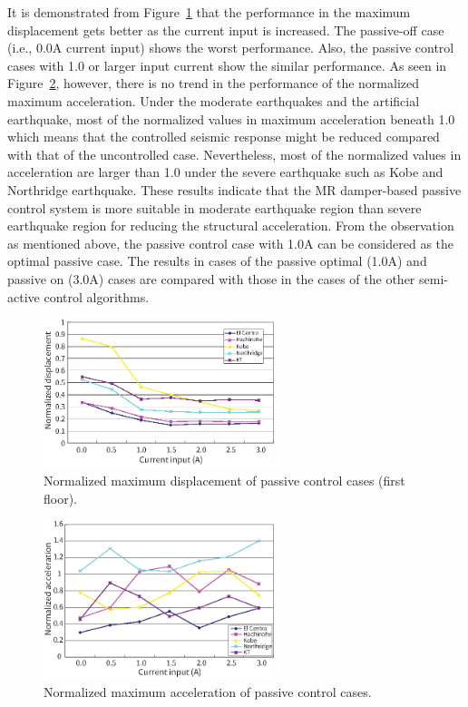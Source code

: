 It is demonstrated from Figure~\ref{fig:n3-12} that the performance in the maximum displacement gets better as the current input is increased. The passive-off case (i.e., 0.0A current input) shows the worst performance. Also, the passive control cases with 1.0 or larger input current show the similar performance. As seen in Figure~\ref{fig:n3-13}, however, there is no trend in the performance of the normalized maximum acceleration. Under the moderate earthquakes and the artificial earthquake, most of the normalized values in maximum acceleration beneath 1.0 which means that the controlled seismic response might be reduced compared with that of the uncontrolled case. Nevertheless, most of the normalized values in acceleration are larger than 1.0 under the severe earthquake such as Kobe and Northridge earthquake. These results indicate that the MR damper-based passive control system is more suitable in moderate earthquake region than severe earthquake region for reducing the structural acceleration. From the observation as mentioned above, the passive control case with 1.0A can be considered as the optimal passive case. The results in cases of the passive optimal (1.0A) and passive on (3.0A) cases are compared with those in the cases of the other semi-active control algorithms.

\begin{figure}[!ht]
\centering
\includegraphics[width=0.6\textwidth] {figure/n3-12.eps}
\caption{Normalized maximum displacement of passive control
cases (first floor).}
\label{fig:n3-12}
\end{figure}

\begin{figure}[!ht]
\centering
\includegraphics[width=0.6\textwidth] {figure/n3-13.eps}
\caption{Normalized maximum acceleration of passive control
cases.}
\label{fig:n3-13}
\end{figure}

